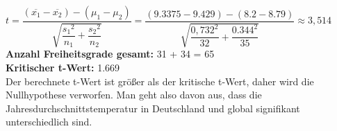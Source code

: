 \documentclass[12pt]{scrartcl}
\begin{document}
\begin{itemize}
$t=\dfrac{(\overline{x_{1}}-\overline{x_{2}}) - (\mu_{1}-\mu_{2})}{\sqrt{\dfrac{{s_{1}}^{2}}{n_1}+\dfrac{{s_{2}}^{2}}{n_2}}} 
=\dfrac{(9.3375 - 9.429)- (8.2-8.79)}{\sqrt{\dfrac{{0,732}^{2}}{32}+\dfrac{{0.344}^{2}}{35}}}  \approx 3,514$\\

\textbf{Anzahl Freiheitsgrade gesamt:} 31 + 34 = 65 \\
\textbf{Kritischer t-Wert:} 1.669\\
Der berechnete t-Wert ist größer als der kritische t-Wert, daher wird die Nullhypothese verworfen. Man geht also davon aus, dass die Jahresdurchschnittstemperatur in Deutschland und global signifikant unterschiedlich sind.
\end{itemize}
                        
                        
\end{document}
